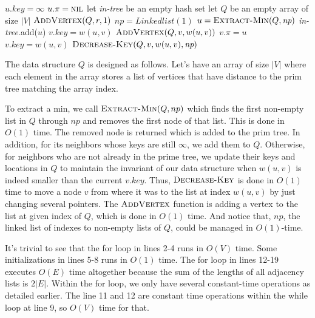 \documentclass[11pt]{article}
\theoremstyle{definition}
\theoremstyle{theorem}
\begin{document}
\begin{algorithmic}[1]
    	\State $u.\textit{key} = \infty$
	\State $u.\pi = \textproc{\textsc{nil}}$
    \EndFor
    \State let \textit{in-tree} be an empty hash set
    \State let $Q$ be an empty array of size $|V|$
    \State $\textproc{\textsc{AddVertex}}(Q, r, 1)$ 
    \State $\textit{np} = \textit{Linkedlist}(1)$ 
    	\State $u = \textproc{\textsc{Extract-Min}}(Q, \textit{np})$
	\State \textit{in-tree}.add($u$)
			\State $v.\textit{key} = w(u, v)$
			\State $\textproc{\textsc{AddVertex}}(Q, v, w(u ,v))$ 
			\State $v.\pi = u$
			\State $v.\textit{key} = w(u, v)$
			\State $\textproc{\textsc{Decrease-Key}}(Q, v, w(u, v), \textit{np})$ 
		\EndIf
	\EndFor
    \EndWhile
\EndFunction
\end{algorithmic}

The data structure $Q$ is designed as follows. Let's have an array of size $|V|$ where each element in the array stores a list of vertices that have distance to the prim tree matching the array index. 

To extract a min, we call $\textproc{\textsc{Extract-Min}}(Q, np)$ which finds the first non-empty list in $Q$ through $\textit{np}$ and removes the first node of that list. This is done in $O(1)$ time. The removed node is returned which is added to the prim tree. In addition, for its neighbors whose keys are still $\infty$, we add them to $Q$. Otherwise, for neighbors who are not already in the prime tree, we update their keys and locations in $Q$ to maintain the invariant of our data structure when $w(u, v)$ is indeed smaller than the current $v.\textit{key}$. Thus, $\textproc{\textsc{Decrease-Key}}$ is done in $O(1)$ time to move a node $v$ from where it was to the list at index $w(u, v)$ by just changing several pointers. The $\textproc{\textsc{AddVertex}}$ function is adding a vertex to the list at given index of $Q$, which is done in $O(1)$ time. And notice that, $\textit{np}$, the linked list of indexes to non-empty lists of $Q$, could be managed in $O(1)$-time.

It's trivial to see that the for loop in lines 2-4 runs in $O(V)$ time. Some initializations in lines 5-8 runs in $O(1)$ time. The for loop in lines 12-19 executes $O(E)$ time altogether because the sum of the lengths of all adjacency lists is $2|E|$. Within the for loop, we only have several constant-time operations as detailed earlier. The line 11 and 12 are constant time operations within the while loop at line 9, so $O(V)$ time for that. 
\end{document}
